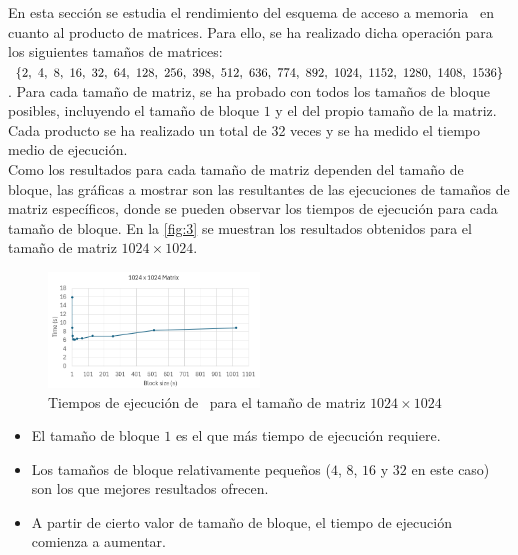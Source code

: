 \pagestyle{fancy}
\fancyhead[l]{\autorUO}
\fancyfoot[l]{\asignaturaAbbr}
\fancyfoot[r]{\fecha}

\section{\zorder} \label{sec:4}
En esta sección se estudia el rendimiento del esquema de acceso a memoria \zorder\ en cuanto al producto de matrices.
Para ello, se ha realizado dicha operación para los siguientes tamaños de matrices:
$\{2,\ 4,\ 8,\ 16,\ 32,\ 64,\ 128,\\ \ 256, \ 398,\ 512,\ 636,\ 774,\ 892,\ 1024,\ 1152,\ 1280,\ 1408,\ 1536\}$. 
Para cada tamaño de matriz, se ha probado con todos los tamaños de bloque posibles, incluyendo el tamaño de bloque $1$ y el del propio tamaño de la matriz. 
Cada producto se ha realizado un total de 32 veces y se ha medido el tiempo medio de ejecución. \\
Como los resultados para cada tamaño de matriz dependen del tamaño de bloque, las gráficas a mostrar son las resultantes de las ejecuciones 
de tamaños de matriz específicos, donde se pueden observar los tiempos de ejecución para cada tamaño de bloque. 
En la \autoref{fig:3} se muestran los resultados obtenidos para el tamaño de matriz $1024 \times 1024$.

\begin{figure}[h]
    \centering
    \includegraphics[width=0.5\textwidth]{img/3.png}
    \caption{Tiempos de ejecución de \zorder\ para el tamaño de matriz $1024 \times 1024$}
    \label{fig:3}
\end{figure}

\begin{itemize}
    \item El tamaño de bloque $1$ es el que más tiempo de ejecución requiere.
    \item Los tamaños de bloque relativamente pequeños ($4$, $8$, $16$ y $32$ en este caso) son los que mejores resultados ofrecen.
    \item A partir de cierto valor de tamaño de bloque, el tiempo de ejecución comienza a aumentar.
\end{itemize}
\vspace{0.25cm}

